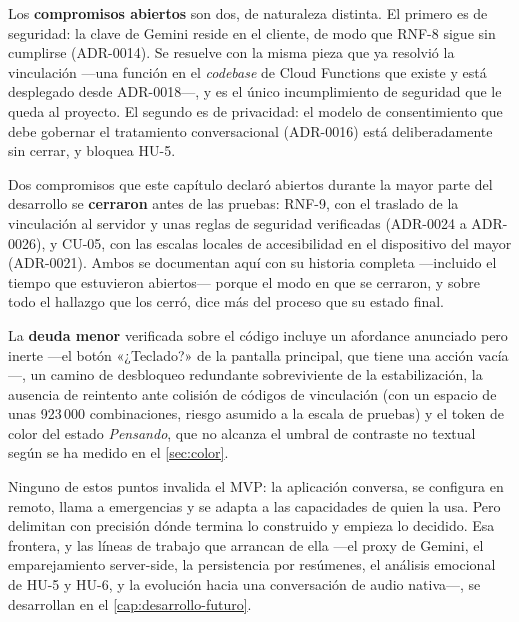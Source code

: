 Los \textbf{compromisos abiertos} son dos, de naturaleza distinta. El primero es de seguridad: la clave de
Gemini reside en el cliente, de modo que RNF-8 sigue sin cumplirse (ADR-0014). Se resuelve con la misma
pieza que ya resolvió la vinculación ---una función en el \emph{codebase} de Cloud Functions que existe y
está desplegado desde ADR-0018---, y es el único incumplimiento de seguridad que le queda al proyecto. El
segundo es de privacidad: el modelo de consentimiento que debe gobernar el tratamiento conversacional
(ADR-0016) está deliberadamente sin cerrar, y bloquea HU-5.

Dos compromisos que este capítulo declaró abiertos durante la mayor parte del desarrollo se \textbf{cerraron}
antes de las pruebas: RNF-9, con el traslado de la vinculación al servidor y unas reglas de seguridad
verificadas (ADR-0024 a ADR-0026), y CU-05, con las escalas locales de accesibilidad en el dispositivo del
mayor (ADR-0021). Ambos se documentan aquí con su historia completa ---incluido el tiempo que estuvieron
abiertos--- porque el modo en que se cerraron, y sobre todo el hallazgo que los cerró, dice más del proceso
que su estado final.

La \textbf{deuda menor} verificada sobre el código incluye un afordance anunciado pero inerte ---el botón
«¿Teclado?» de la pantalla principal, que tiene una acción vacía---, un camino de desbloqueo redundante
sobreviviente de la estabilización, la ausencia de reintento ante colisión de códigos de vinculación (con un
espacio de unas 923\,000 combinaciones, riesgo asumido a la escala de pruebas) y el token de color del
estado \emph{Pensando}, que no alcanza el umbral de contraste no textual según se ha medido en el
\autoref{sec:color}.

Ninguno de estos puntos invalida el MVP: la aplicación conversa, se configura en remoto, llama a emergencias
y se adapta a las capacidades de quien la usa. Pero delimitan con precisión dónde termina lo construido y
empieza lo decidido. Esa frontera, y las líneas de trabajo que arrancan de ella ---el proxy de Gemini, el
emparejamiento server-side, la persistencia por resúmenes, el análisis emocional de HU-5 y HU-6, y la
evolución hacia una conversación de audio nativa---, se desarrollan en el \autoref{cap:desarrollo-futuro}.
